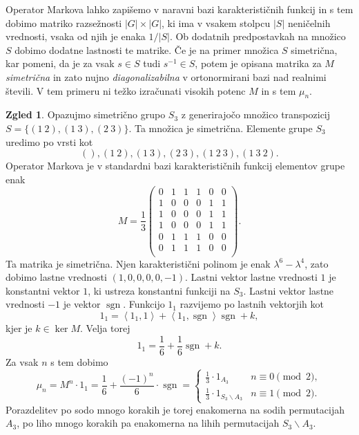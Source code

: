 \documentclass[11pt]{book}
\DeclareMathOperator\sgn{sgn}
\theoremstyle{definition}
\theoremstyle{zgled}
\newtheorem*{zgled}{Zgled}
\theoremstyle{odprtproblem}
\theoremstyle{domacanaloga}
\theoremstyle{izrek}
\begin{document}
Operator Markova lahko zapišemo v naravni bazi karakterističnih funkcij in s tem dobimo matriko razsežnosti $|G| \times |G|$, ki ima v vsakem stolpcu $|S|$ neničelnih vrednosti, vsaka od njih je enaka $1/|S|$. Ob dodatnih predpostavkah na množico $S$ dobimo dodatne lastnosti te matrike. Če je na primer množica $S$ simetrična, kar pomeni, da je za vsak $s \in S$ tudi $s^{-1} \in S$, potem je opisana matrika za $M$ \emph{simetrična} in zato nujno \emph{diagonalizabilna} v ortonormirani bazi nad realnimi števili. V tem primeru ni težko izračunati visokih potenc $M$ in s tem $\mu_n$.

\begin{zgled}
Opazujmo simetrično grupo $S_3$ z generirajočo množico transpozicij $S = \{ (1 \ 2), (1 \ 3), (2 \ 3)\}$. Ta množica je simetrična. Elemente grupe $S_3$ uredimo po vrsti kot
\[
    (),
    (1 \ 2),
    (1 \ 3),
    (2 \ 3),
    (1 \ 2 \ 3),
    (1 \ 3 \ 2).
\]
Operator Markova je v standardni bazi karakterističnih funkcij 
elementov grupe enak
\[
    M = \frac13 \begin{pmatrix}
        0 & 1 & 1 & 1 & 0 & 0 \\
        1 & 0 & 0 & 0 & 1 & 1 \\
        1 & 0 & 0 & 0 & 1 & 1 \\
        1 & 0 & 0 & 0 & 1 & 1 \\
        0 & 1 & 1 & 1 & 0 & 0 \\
        0 & 1 & 1 & 1 & 0 & 0 \\
    \end{pmatrix}.
\]
Ta matrika je simetrična. Njen karakteristični polinom je enak $\lambda^6 - \lambda^4$, zato dobimo lastne vrednosti $(1,0,0,0,0,-1)$. Lastni vektor lastne vrednosti $1$ je konstantni vektor $1$, ki ustreza konstantni funkciji na $S_3$. Lastni vektor lastne vrednosti $-1$ je vektor $\sgn$. Funkcijo $1_1$ razvijemo po lastnih vektorjih kot
\[
    1_1 = 
    \left\langle 1_1, 1 \right\rangle +
    \left\langle 1_1, \sgn \right\rangle \sgn +
    k,
\]
kjer je $k \in \ker M$. Velja torej
\[
    1_1 =
    \frac{1}{6} + \frac{1}{6} \sgn + k.
\]
Za vsak $n$ s tem dobimo
\[
    \mu_n = M^n \cdot 1_1 = \frac{1}{6} + \frac{(-1)^n}{6} \cdot \sgn
    = \begin{cases}
        \frac{1}{3} \cdot 1_{A_3} & n \equiv 0 \pmod{2}, \\
        \frac{1}{3} \cdot 1_{S_3 \backslash A_3} & n \equiv 1 \pmod{2}.
    \end{cases}
\]
Porazdelitev po sodo mnogo korakih je torej enakomerna na sodih permutacijah $A_3$, po liho mnogo korakih pa enakomerna na lihih permutacijah $S_3 \backslash A_3$.
\end{zgled}
\end{document}
